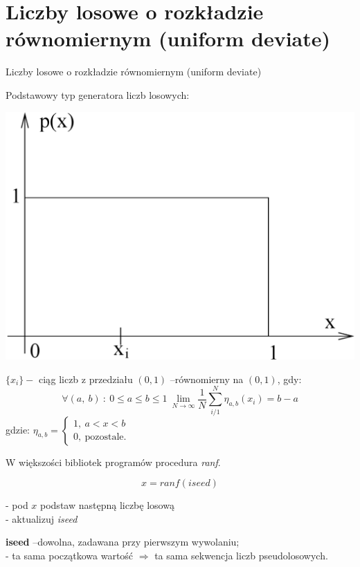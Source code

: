 \section{Liczby losowe o rozkładzie równomiernym (uniform deviate)}
\begin{frame}{Liczby losowe o rozkładzie równomiernym (uniform deviate)}


	Podstawowy typ generatora liczb losowych:
	\begin{center}
	\includegraphics[scale=0.15]{img/14/14_2_img}
	\end{center}
    \end{frame}

    \begin{frame}
    \begin{exampleblock}{}
	$\{x_{i}\}-$ ciąg liczb z przedziału $(0,1)$ --równomierny na $(0,1)$, gdy:
	$$
	\forall(a,\ b)\ :\ 0\leq a\leq b\leq 1\ \lim_{N\rightarrow\infty}\frac{1}{N}\sum_{i/1}^{N}\eta_{a,b}		(x_{i})=b-a
	$$
	gdzie: $\eta_{a,b}=\left\{\begin{array}{l}
	1,\ a<x<b\\
	0,\ \mathrm{p}\mathrm{o}\mathrm{z}\mathrm{o}\mathrm{s}\mathrm{t}\mathrm{a}\mathrm{l}\mathrm{e}.
	\end{array}\right.$
	\end{exampleblock}
	W większości bibliotek programów procedura \textit{ranf}.

            \[
            	x = ranf(iseed)
            \]

	- pod $x$ podstaw następną liczbę losową \\
    - aktualizuj \textit{iseed}

	\textbf{iseed} --dowolna, zadawana przy pierwszym wywolaniu; \\
	- ta sama początkowa wartość $\Rightarrow$ ta sama sekwencja liczb pseudolosowych.
	\end{frame}
